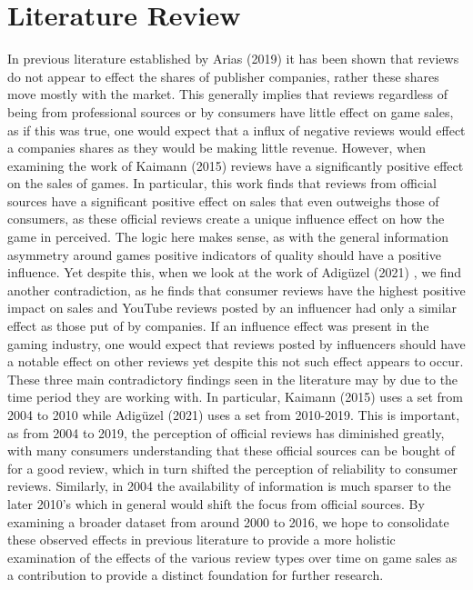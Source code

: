 \documentclass[12pt,english]{article}
\begin{document}
\section{Literature Review}\label{sec:litreview}
In previous literature established by Arias (2019) \cite{canto2019effect} it has been shown that reviews do not appear to effect the shares of publisher companies, rather these shares move mostly with the market. This generally implies that reviews regardless of being from professional sources or by consumers have little effect on game sales, as if this was true, one would expect that a influx of 
negative reviews would effect a companies shares as they would be making little revenue. 
However, when examining the work of Kaimann (2015)\cite{cox2015reviews} reviews have a significantly positive effect on the sales of games. In particular, this work finds that reviews from official sources have a significant positive effect on sales that even outweighs those of consumers, as these official reviews create a unique influence effect on how the game in perceived. The logic here makes 
sense, as with the general information asymmetry around games positive indicators of quality 
should have a positive influence. Yet despite this, when we look at the work of Adigüzel (2021) \cite{adiguzel2021youtube}, 
we find another contradiction, as he finds that consumer reviews have the highest positive impact 
on sales and YouTube reviews posted by an influencer had only a similar effect as those put of by 
companies. If an influence effect was present in the gaming industry, one would expect that 
reviews posted by influencers should have a notable effect on other reviews yet despite this not 
such effect appears to occur. These three main contradictory findings seen in the literature may 
by due to the time period they are working with. In particular, Kaimann (2015) uses a set from 
2004 to 2010 while Adigüzel (2021) uses a set from 2010-2019. This is important, as from 2004 
to 2019, the perception of official reviews has diminished greatly, with many consumers 
understanding that these official sources can be bought of for a good review, which in turn 
shifted the perception of reliability to consumer reviews. Similarly, in 2004 the availability of 
information is much sparser to the later 2010’s which in general would shift the focus from 
official sources. By examining a broader dataset from around 2000 to 2016, we hope to 
consolidate these observed effects in previous literature to provide a more holistic examination of 
the effects of the various review types over time on game sales as a contribution to provide a 
distinct foundation for further research. 
\end{document}
